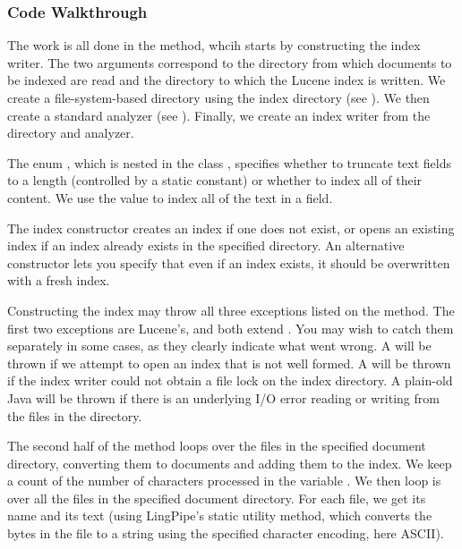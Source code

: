 \subsubsection{Code Walkthrough}

The work is all done in the  method, whcih starts by
constructing the index writer.
%
%
The two arguments correspond to the directory from which documents to
be indexed are read and the directory to which the Lucene index is
written.  We create a file-system-based directory using the index
directory (see ).  We then create a standard
analyzer (see ).  Finally, we create an index
writer from the directory and analyzer.  

The enum , which is nested in the class
, specifies whether to truncate text fields to a
length (controlled by a static constant) or whether to index all of
their content.  We use the value  to
index all of the text in a field.

The index constructor creates an index if one does not exist, or opens
an existing index if an index already exists in the specified
directory.  An alternative constructor lets you specify that even if
an index exists, it should be overwritten with a fresh index.

Constructing the index may throw all three exceptions listed on the
 method.  The first two exceptions are Lucene's, and both
extend .  You may wish to catch them separately in
some cases, as they clearly indicate what went wrong. A
 will be thrown if we attempt to open an
index that is not well formed.  A 
will be thrown if the index writer could not obtain a file lock on the
index directory.  A plain-old Java  will be thrown
if there is an underlying I/O error reading or writing from the files
in the directory.

The second half of the  method loops over the files
in the specified document directory, converting them to documents
and adding them to the index.
%
%
We keep a count of the number of characters processed in the variable
.  We then loop is over all the files in the specified
document directory.  For each file, we get its name and its text
(using LingPipe's static  utility method, which
converts the bytes in the file to a string using the specified
character encoding, here ASCII).  

